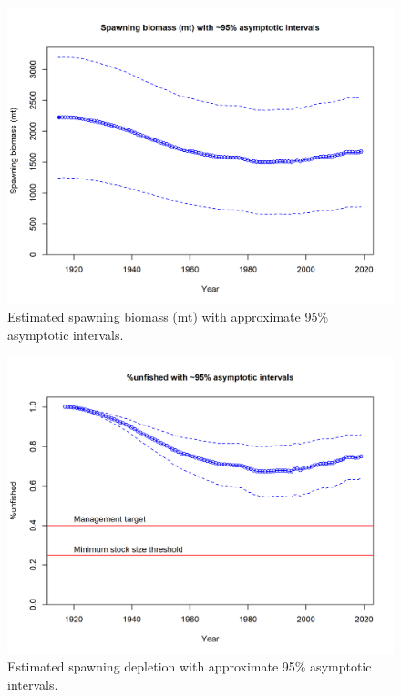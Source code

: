 \documentclass[12pt,]{article}
\begin{document}
\newpage

\begin{figure}
\centering
\includegraphics{r4ss/plots_mod1/ts7_Spawning_biomass_(mt)_with_95_asymptotic_intervals_intervals.png}
\caption{Estimated spawning biomass (mt) with approximate 95\%
asymptotic intervals.
\label{fig:ts7_Spawning_biomass_(mt)_with_95_asymptotic_intervals_intervals}}
\end{figure}

\begin{figure}
\centering
\includegraphics{r4ss/plots_mod1/ts9_unfished_with_95_asymptotic_intervals_intervals.png}
\caption{Estimated spawning depletion with approximate 95\% asymptotic
intervals.
\label{fig:ts9_unfished_with_95_asymptotic_intervals_intervals}}
\end{figure}
\end{document}
